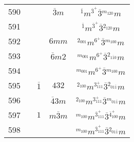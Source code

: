 \begin{longtable}{ccccc}
  590 &  &  & $\overline{3}m$ & ${}^{\overline{1}} m {}^{\overline{3}^{+}} \overline{3} {}^{m_{120}} m $\\
  591 &  &  &  & ${}^{\overline{1}} m {}^{\overline{3}^{+}} \overline{3} {}^{2_{120}} m $\\
  592 &  &  & $6mm$ & ${}^{2_{001}} m {}^{6^{+}} \overline{3} {}^{m_{100}} m $\\
  593 &  &  & $\overline{6}m2$ & ${}^{m_{001}} m {}^{6^{+}} \overline{3} {}^{2_{1\overline{1}0}} m $\\
  594 &  &  &  & ${}^{m_{001}} m {}^{6^{+}} \overline{3} {}^{m_{100}} m $\\
  595 &  & $\overline{1}$ & $432$ & ${}^{2_{100}} m {}^{3^{+}_{111}} \overline{3} {}^{2_{01\overline{1}}} m $\\
  596 &  &  & $\overline{4}3m$ & ${}^{2_{100}} m {}^{3^{+}_{111}} \overline{3} {}^{m_{01\overline{1}}} m $\\
  597 &  & $1$ & $m\overline{3}m$ & ${}^{m_{100}} m {}^{\overline{3}^{+}_{111}} \overline{3} {}^{\overline{4}^{+}_{100}} m $\\
  598 &  &  &  & ${}^{m_{100}} m {}^{\overline{3}^{+}_{111}} \overline{3} {}^{2_{01\overline{1}}} m $\\
  \hline\hline
\end{longtable}
